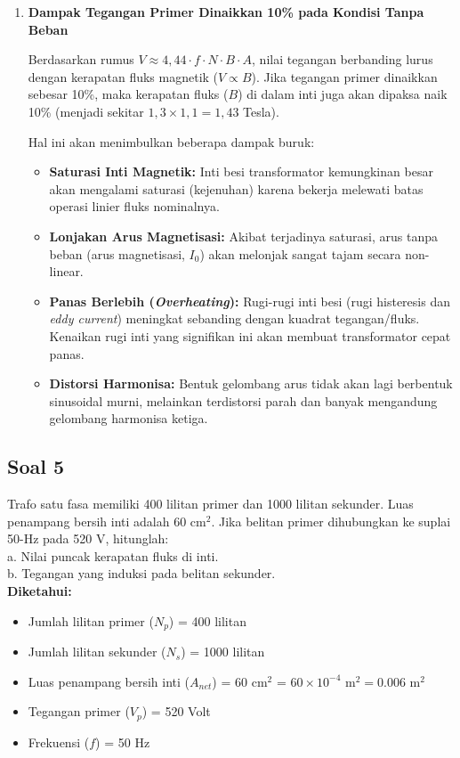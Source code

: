 \documentclass[12pt, a4paper]{article}
\begin{document}
\begin{enumerate}[label=\alph*.]
    \item \textbf{Dampak Tegangan Primer Dinaikkan 10\% pada Kondisi Tanpa Beban}

    Berdasarkan rumus $V \approx 4,44 \cdot f \cdot N \cdot B \cdot A$, nilai tegangan berbanding lurus dengan kerapatan fluks magnetik ($V \propto B$). Jika tegangan primer dinaikkan sebesar 10\%, maka kerapatan fluks ($B$) di dalam inti juga akan dipaksa naik 10\% (menjadi sekitar $1,3 \times 1,1 = 1,43$ Tesla).

    Hal ini akan menimbulkan beberapa dampak buruk:
    \begin{itemize}
        \item \textbf{Saturasi Inti Magnetik:} Inti besi transformator kemungkinan besar akan mengalami saturasi (kejenuhan) karena bekerja melewati batas operasi linier fluks nominalnya.
        \item \textbf{Lonjakan Arus Magnetisasi:} Akibat terjadinya saturasi, arus tanpa beban (arus magnetisasi, $I_0$) akan melonjak sangat tajam secara non-linear.
        \item \textbf{Panas Berlebih (\textit{Overheating}):} Rugi-rugi inti besi (rugi histeresis dan \textit{eddy current}) meningkat sebanding dengan kuadrat tegangan/fluks. Kenaikan rugi inti yang signifikan ini akan membuat transformator cepat panas.
        \item \textbf{Distorsi Harmonisa:} Bentuk gelombang arus tidak akan lagi berbentuk sinusoidal murni, melainkan terdistorsi parah dan banyak mengandung gelombang harmonisa ketiga.
    \end{itemize}
\end{enumerate}

\subsection*{Soal 5}
Trafo satu fasa memiliki 400 lilitan primer dan 1000 lilitan sekunder. Luas penampang bersih inti adalah 60 cm$^2$. Jika belitan primer dihubungkan ke suplai 50-Hz pada 520 V, hitunglah:\\
a. Nilai puncak kerapatan fluks di inti.\\
b. Tegangan yang induksi pada belitan sekunder.\\

\textbf{Diketahui:}
\begin{itemize}
    \item Jumlah lilitan primer ($N_p$) = 400 lilitan
    \item Jumlah lilitan sekunder ($N_s$) = 1000 lilitan
    \item Luas penampang bersih inti ($A_{net}$) = 60 cm$^2$ = $60 \times 10^{-4} \text{ m}^2 = 0.006 \text{ m}^2$
    \item Tegangan primer ($V_p$) = 520 Volt
    \item Frekuensi ($f$) = 50 Hz
\end{itemize}
\end{document}
